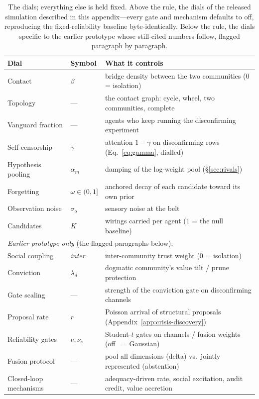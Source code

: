 \documentclass[runningheads]{llncs}
\begin{document}
\begin{table}[h!]
\centering\footnotesize
\begin{tabular}{lll}
\hline
Dial & Symbol & What it controls \\
\hline
Contact & $\beta$ & bridge density between the two communities (0 = isolation) \\
Topology & --- & the contact graph: cycle, wheel, two communities, complete \\
Vanguard fraction & --- & agents who keep running the disconfirming experiment \\
Self-censorship & $\gamma$ & attention $1-\gamma$ on disconfirming rows (Eq.~\ref{eq:gamma},
dialled) \\
Hypothesis pooling & $\alpha_m$ & damping of the log-weight pool (\S\ref{sec:rivals}) \\
Forgetting & $\omega\in(0,1]$ & anchored decay of each candidate toward its own prior \\
Observation noise & $\sigma_o$ & sensory noise at the belt \\
Candidates & $K$ & wirings carried per agent ($1$ = the null baseline) \\
\hline
\multicolumn{3}{l}{\emph{Earlier prototype only} (the flagged paragraphs below):}\\
Social coupling & \emph{inter} & inter-community trust weight (0 = isolation) \\
Conviction & $\lambda_d$ & dogmatic community's value tilt / prune protection \\
Gate scaling & --- & strength of the conviction gate on disconfirming channels \\
Proposal rate & $r$ & Poisson arrival of structural proposals
(Appendix~\ref{app:crisis-discovery}) \\
Reliability gates & $\nu,\nu_s$ & Student-$t$ gates on channels / fusion weights (off $=$
Gaussian) \\
Fusion protocol & --- & pool all dimensions (delta) vs.\ jointly represented (abstention) \\
Closed-loop mechanisms & --- & adequacy-driven rate, social excitation, audit credit, value
accretion \\
\hline
\end{tabular}
\caption{The dials; everything else is held fixed. Above the rule, the dials of the released
simulation described in this appendix---every gate and mechanism defaults to off,
reproducing the fixed-reliability baseline byte-identically. Below the rule, the dials
specific to the earlier prototype whose still-cited numbers follow, flagged paragraph by
paragraph.}
\label{tab:dials}
\end{table}
\end{document}

